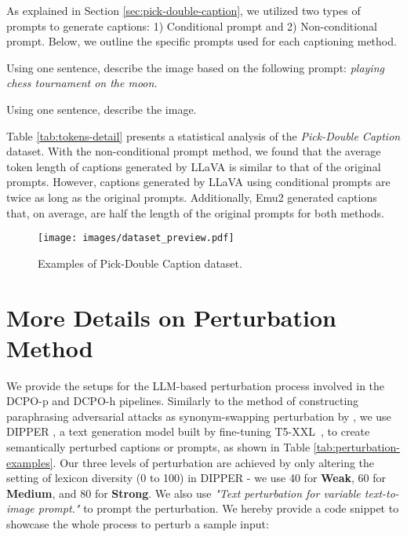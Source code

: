 As explained in Section \ref{sec:pick-double-caption}, we utilized two types of prompts to generate captions: 1) Conditional prompt and 2) Non-conditional prompt. Below, we outline the specific prompts used for each captioning method.

\begin{tcolorbox}[colback=black!5, colframe=black, title= Example of Conditional Prompt]
Using one sentence, describe the image based on the following prompt: \textit{playing chess tournament on the moon.}
\end{tcolorbox}

\begin{tcolorbox}[colback=black!5, colframe=black, title= Example of Non-Conditional Prompt]
Using one sentence, describe the image.
\end{tcolorbox}


Table \ref{tab:tokens-detail} presents a statistical analysis of the \textit{Pick-Double Caption} dataset. With the non-conditional prompt method, we found that the average token length of captions generated by LLaVA is similar to that of the original prompts. However, captions generated by LLaVA using conditional prompts are twice as long as the original prompts. Additionally, Emu2 generated captions that, on average, are half the length of the original prompts for both methods.





\begin{figure}[h]
    \centering
    
    \texttt{[image: images/dataset\_preview.pdf]}
    \vspace{-2em}
    \caption{Examples of Pick-Double Caption dataset.}
    \label{fig:pick_double_caption_samples}
\end{figure}

\section{More Details on Perturbation Method}
\label{sec:appendix_perturbation}



We provide the setups for the LLM-based perturbation process involved in the DCPO-p and DCPO-h pipelines. Similarly to the method of constructing paraphrasing adversarial attacks as synonym-swapping perturbation by \citet{dipper}, we use DIPPER \citep{dipper}, a text generation model built by fine-tuning T5-XXL~\citep{t5}, to create semantically perturbed captions or prompts, as shown in Table \ref{tab:perturbation-examples}. Our three levels of perturbation are achieved by only altering the setting of lexicon diversity (0 to 100) in DIPPER - we use 40 for \textbf{Weak}, 60 for \textbf{Medium}, and 80 for \textbf{Strong}. We also use \textit{"Text perturbation for variable text-to-image prompt."} to prompt the perturbation. We hereby provide a code snippet to showcase the whole process to perturb a sample input:


